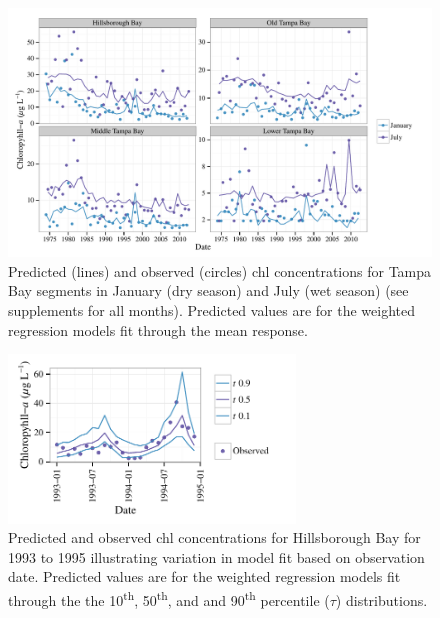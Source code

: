 \documentclass{svjour3}\usepackage[]{graphicx}\usepackage[]{color}
\begin{document}
\begin{figure}[!ht]


{\centering \includegraphics[width=6in]{figspredobs} 

}

\caption[Predicted (lines) and observed (circles) \ac{chl} concentrations for Tampa Bay segments in January (dry season) and July (wet season) (see supplements for all months)]{Predicted (lines) and observed (circles) \ac{chl} concentrations for Tampa Bay segments in January (dry season) and July (wet season) (see supplements for all months).  Predicted values are for the weighted regression models fit through the mean response.\label{fig:predobs}}
\end{figure}



\begin{figure}[!ht]


{\centering \includegraphics[width=3in]{figshbslice} 

}

\caption[Predicted and observed \ac{chl} concentrations for Hillsborough Bay for 1993 to 1995 illustrating variation in model fit based on observation date]{Predicted and observed \ac{chl} concentrations for Hillsborough Bay for 1993 to 1995 illustrating variation in model fit based on observation date. Predicted values are for the weighted regression models fit through the the 10\textsuperscript{th}, 50\textsuperscript{th}, and and 90\textsuperscript{th} percentile ($\tau$) distributions.\label{fig:hbslice}}
\end{figure}
\end{document}
